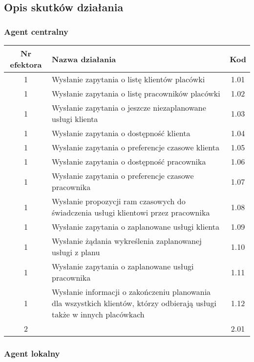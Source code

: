 \subsection{Opis skutków działania}

\subsubsection{Agent centralny}

\begin{tabular}{c|p{5cm}|c}
Nr efektora & Nazwa działania & Kod\\
\hline
1 & Wysłanie zapytania o listę klientów placówki & 1.01\\
1 & Wysłanie zapytania o listę pracowników placówki & 1.02\\
1 & Wysłanie zapytania o jeszcze niezaplanowane usługi klienta & 1.03\\
1 & Wysłanie zapytania o dostępność klienta & 1.04\\
1 & Wysłanie zapytania o preferencje czasowe klienta & 1.05\\
1 & Wysłanie zapytania o dostępność pracownika & 1.06\\
1 & Wysłanie zapytania o preferencje czasowe pracownika & 1.07\\
1 & Wysłanie propozycji ram czasowych do świadczenia usługi klientowi przez pracownika & 1.08\\
1 & Wysłanie zapytania o zaplanowane usługi klienta & 1.09\\
1 & Wysłanie żądania wykreślenia zaplanowanej usługi z planu & 1.10\\
1 & Wysłanie zapytania o zaplanowane usługi pracownika & 1.11\\
1 & Wysłanie informacji o zakończeniu planowania dla wszystkich klientów, którzy odbierają usługi także w innych placówkach & 1.12\\
\hline
2 & 	 & 2.01\\
\end{tabular}

\subsubsection{Agent lokalny}


